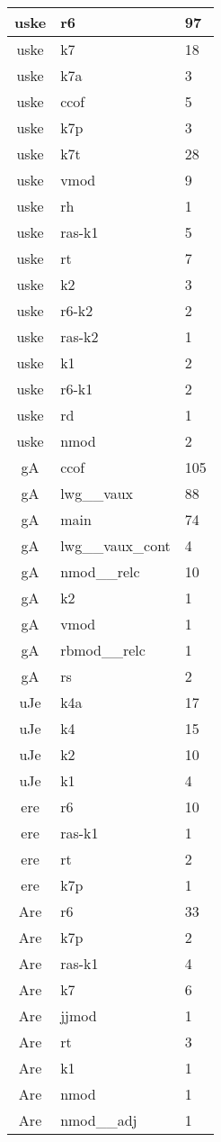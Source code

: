 \documentclass[a4 paper]{article}
\begin{document}
\begin{longtable}{cp{}p{}}
uske & r6 & 97\\ \midrule uske & k7 & 18\\ \midrule uske & k7a & 3\\ \midrule uske & ccof & 5\\ \midrule uske & k7p & 3\\ \midrule uske & k7t & 28\\ \midrule uske & vmod & 9\\ \midrule uske & rh & 1\\ \midrule uske & ras-k1 & 5\\ \midrule uske & rt & 7\\ \midrule uske & k2 & 3\\ \midrule uske & r6-k2 & 2\\ \midrule uske & ras-k2 & 1\\ \midrule uske & k1 & 2\\ \midrule uske & r6-k1 & 2\\ \midrule uske & rd & 1\\ \midrule uske & nmod & 2\\ \midrule 
gA & ccof & 105\\ \midrule gA & lwg\_\_vaux & 88\\ \midrule gA & main & 74\\ \midrule gA & lwg\_\_vaux\_cont & 4\\ \midrule gA & nmod\_\_relc & 10\\ \midrule gA & k2 & 1\\ \midrule gA & vmod & 1\\ \midrule gA & rbmod\_\_relc & 1\\ \midrule gA & rs & 2\\ \midrule 
uJe & k4a & 17\\ \midrule uJe & k4 & 15\\ \midrule uJe & k2 & 10\\ \midrule uJe & k1 & 4\\ \midrule 
ere & r6 & 10\\ \midrule ere & ras-k1 & 1\\ \midrule ere & rt & 2\\ \midrule ere & k7p & 1\\ \midrule 
Are & r6 & 33\\ \midrule Are & k7p & 2\\ \midrule Are & ras-k1 & 4\\ \midrule Are & k7 & 6\\ \midrule Are & jjmod & 1\\ \midrule Are & rt & 3\\ \midrule Are & k1 & 1\\ \midrule Are & nmod & 1\\ \midrule Are & nmod\_\_adj & 1\\ \midrule 

\end{longtable}
\end{document}
